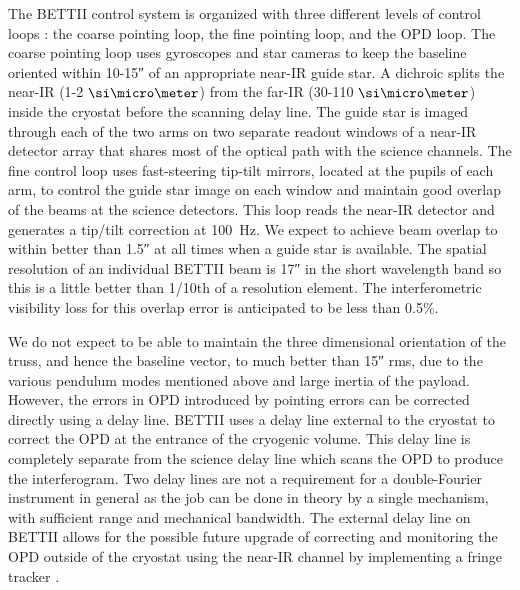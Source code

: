 The BETTII control system is organized with three different levels of control loops \citep{Rizzo:2014jq}: the coarse pointing loop, the fine pointing loop, and the OPD loop. The coarse pointing loop uses gyroscopes and star cameras to keep the baseline oriented within 10-\ang{;;15} of an appropriate near-IR guide star. A dichroic splits the near-IR (1-2$~\um$) from the far-IR (30-110$~\um$) inside the cryostat before the scanning delay line. The guide star is imaged through each of the two arms on two separate readout windows of a near-IR detector array that shares most of the optical path with the science channels. The fine control loop uses fast-steering tip-tilt mirrors, located at the pupils of each arm, to control the guide star image on each window and maintain good overlap of the beams at the science detectors. This loop reads the near-IR detector and generates a tip/tilt correction at 100~Hz. We expect to achieve beam overlap to within better than \ang{;;1.5} at all times when a guide star is available. The spatial resolution of an individual BETTII beam
is \ang{;;17} in the short wavelength band so this is a little better than 1/10th of a resolution element. The interferometric visibility loss
for this overlap error is anticipated to be less than 0.5\%.

We do not expect to be able to maintain the three dimensional orientation of the truss, and hence the baseline
vector, to much better than \ang{;;15} rms, due to the various pendulum modes mentioned above and large inertia of the payload.
However, the errors in OPD introduced by pointing errors can be corrected directly using a delay line. BETTII uses a delay line external to the cryostat to correct the OPD at the entrance of the cryogenic volume. This delay line is completely separate from the science delay line which scans the OPD to produce the interferogram. Two delay lines are not a requirement for a double-Fourier instrument in general as the job can be done in theory by a single mechanism, with sufficient range and mechanical bandwidth. The external delay line on BETTII allows for the possible future upgrade
of correcting and monitoring the OPD outside of the cryostat using the near-IR channel by implementing a fringe tracker \citep{Rizzo:2012jp}.

